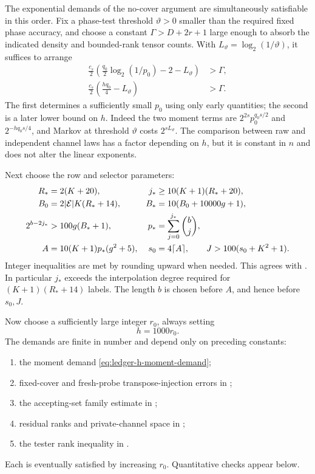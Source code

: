 The exponential demands of the no-cover argument are simultaneously
satisfiable in this order. Fix a phase-test threshold \(\vartheta>0\)
smaller than the required fixed phase accuracy, and choose a constant
\(\Gamma>D+2r+1\) large enough to absorb the indicated density and
bounded-rank tensor counts. With \(L_\vartheta=\log_2(1/\vartheta)\),
it suffices to arrange
\begin{align}
 \frac{c_s}{2}
 \left(\frac{q_0}{2}\log_2(1/p_0)-2-L_\vartheta\right)
     &>\Gamma,\label{eq:ledger-p0-demand}\\
 \frac{c_s}{2}
 \left(\frac{hq_0}{4}-L_\vartheta\right)
     &>\Gamma.\label{eq:ledger-h-moment-demand}
\end{align}
The first determines a sufficiently small \(p_0\) using only early
quantities; the second is a later lower bound on \(h\).
Indeed the two moment terms are
\(2^{2s}p_0^{q_0s/2}\) and \(2^{-hq_0s/4}\), and Markov at threshold
\(\vartheta\) costs \(2^{sL_\vartheta}\).
The comparison between raw and independent channel laws has a factor
depending on \(h\), but it is constant in \(n\) and does not alter the
linear exponents.

Next choose the row and selector parameters:
\begin{align}
 R_*&=2(K+20),&
 j_*&\ge10(K+1)(R_*+20),\nonumber\\
 B_0&=2|\mathcal E|K(R_*+14),&
 B_*&=10(B_0+10000g+1),\nonumber\\
 2^{b-2j_*}&>100g(B_*+1),&
 p_*&=\sum_{j=0}^{j_*}\binom bj,\nonumber\\
 A&=10(K+1)p_*(g^2+5),&
 s_0&=4\lceil A\rceil,\qquad
 J>100(s_0+K^2+1).
 \label{eq:ledger-selectors}
\end{align}
Integer inequalities are met by rounding upward when needed.
This agrees with .
In particular \(j_*\) exceeds the interpolation degree required for
\((K+1)(R_*+14)\) labels. The length \(b\) is chosen before \(A\),
and hence before \(s_0,J\).

Now choose a sufficiently large integer \(r_0\), always setting
\begin{equation}
                         h=1000r_0.
 \label{eq:ledger-channels}
\end{equation}
The demands are finite in number and depend only on preceding
constants:
\begin{enumerate}
\item the moment demand \eqref{eq:ledger-h-moment-demand};
\item fixed-cover and fresh-probe transpose-injection errors in
  ;
\item the accepting-set family estimate in ;
\item residual ranks and private-channel space in
  ;
\item the tester rank inequality in .
\end{enumerate}
Each is eventually satisfied by increasing \(r_0\).
Quantitative checks appear below.

